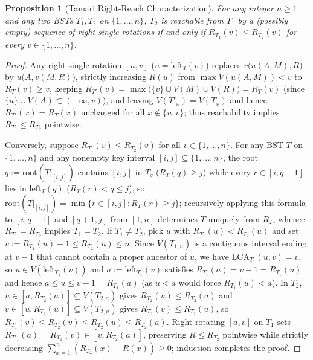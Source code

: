 \documentclass[11pt]{article}
\newtheorem{proposition}[theorem]{Proposition}
\theoremstyle{definition}
\theoremstyle{remark}
\newcommand{\LCA}{\mathrm{LCA}}
\begin{document}
\begin{proposition}[Tamari Right-Reach Characterization]
\label{prop:right-reach}
For any integer $n \ge 1$ and any two BSTs $T_1, T_2$ on $\{1, \dots, n\}$, $T_2$ is reachable from $T_1$ by a (possibly empty) sequence of right single rotations if and only if $R_{T_1}(v) \le R_{T_2}(v)$ for every $v \in \{1, \dots, n\}$.
\end{proposition}

\begin{proof}
Any right single rotation $[u, v]$ ($u = \mathrm{left}_T(v)$) replaces $v\big(u(A, M), R\big)$ by $u\big(A, v(M, R)\big)$, strictly increasing $R(u)$ from $\max V(u(A, M)) < v$ to $R_T(v) \ge v$, keeping $R_{T'}(v) = \max\big(\{v\} \cup V(M) \cup V(R)\big) = R_T(v)$ (since $\{u\} \cup V(A) \subset (-\infty, v)$), and leaving $V(T'_x) = V(T_x)$ and hence $R_{T'}(x) = R_T(x)$ unchanged for all $x \notin \{u, v\}$; thus reachability implies $R_{T_1} \le R_{T_2}$ pointwise.

Conversely, suppose $R_{T_1}(v) \le R_{T_2}(v)$ for all $v \in \{1, \dots, n\}$. For any BST $T$ on $\{1, \dots, n\}$ and any nonempty key interval $[i, j] \subseteq \{1, \dots, n\}$, the root $q := \mathrm{root}(T|_{[i, j]})$ contains $[i, j]$ in $T_q$ ($R_T(q) \ge j$) while every $r \in [i, q - 1]$ lies in $\mathrm{left}_T(q)$ ($R_T(r) < q \le j$), so $\mathrm{root}(T|_{[i, j]}) = \min\{r \in [i, j] : R_T(r) \ge j\}$; recursively applying this formula to $[i, q - 1]$ and $[q + 1, j]$ from $[1, n]$ determines $T$ uniquely from $R_T$, whence $R_{T_1} = R_{T_2}$ implies $T_1 = T_2$. If $T_1 \ne T_2$, pick $u$ with $R_{T_1}(u) < R_{T_2}(u)$ and set $v := R_{T_1}(u) + 1 \le R_{T_2}(u) \le n$. Since $V(T_{1, u})$ is a contiguous interval ending at $v - 1$ that cannot contain a proper ancestor of $u$, we have $\LCA_{T_1}(u, v) = v$, so $u \in V(\mathrm{left}_{T_1}(v))$ and $a := \mathrm{left}_{T_1}(v)$ satisfies $R_{T_1}(a) = v - 1 = R_{T_1}(u)$ and hence $a \le u \le v - 1 = R_{T_1}(a)$ (as $u < a$ would force $R_{T_1}(u) < a$). In $T_2$, $u \in [a, R_{T_2}(a)] \subseteq V(T_{2, a})$ gives $R_{T_2}(u) \le R_{T_2}(a)$ and $v \in [u, R_{T_2}(u)] \subseteq V(T_{2, u})$ gives $R_{T_2}(v) \le R_{T_2}(u)$, so $R_{T_1}(v) \le R_{T_2}(v) \le R_{T_2}(u) \le R_{T_2}(a)$. Right-rotating $[a, v]$ on $T_1$ sets $R_{T'_1}(a) = R_{T_1}(v) \in [v, R_{T_2}(a)]$, preserving $R \le R_{T_2}$ pointwise while strictly decreasing $\sum_{x=1}^n (R_{T_2}(x) - R(x)) \ge 0$; induction completes the proof.
\end{proof}
\end{document}
